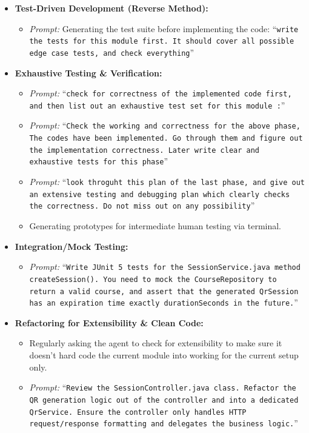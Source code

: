 \documentclass[11pt,a4paper]{article}
\begin{document}
\begin{itemize}[leftmargin=*, itemsep=6pt]
    \item \textbf{Test-Driven Development (Reverse Method):}
    \begin{itemize}[itemsep=4pt]
        \item \textit{Prompt:} Generating the test suite before implementing the code: ``\texttt{write the tests for this module first. It should cover all possible edge case tests, and check everything}''
    \end{itemize}

    \item \textbf{Exhaustive Testing \& Verification:}
    \begin{itemize}[itemsep=4pt]
        \item \textit{Prompt:} ``\texttt{check for correctness of the implemented code first, and then list out an exhaustive test set for this module :}''
        \item \textit{Prompt:} ``\texttt{Check the working and correctness for the above phase, The codes have been implemented. Go through them and figure out the implementation correctness. Later write clear and exhaustive tests for this phase}''
        \item \textit{Prompt:} ``\texttt{look throguht this plan of the last phase, and give out an extensive testing and debugging plan which clearly checks the correctness. Do not miss out on any possibility}''
        \item Generating prototypes for intermediate human testing via terminal.
    \end{itemize}

    \item \textbf{Integration/Mock Testing:}
    \begin{itemize}[itemsep=4pt]
        \item \textit{Prompt:} ``\texttt{Write JUnit 5 tests for the SessionService.java method createSession(). You need to mock the CourseRepository to return a valid course, and assert that the generated QrSession has an expiration time exactly durationSeconds in the future.}''
    \end{itemize}

    \item \textbf{Refactoring for Extensibility \& Clean Code:}
    \begin{itemize}[itemsep=4pt]
        \item Regularly asking the agent to check for extensibility to make sure it doesn't hard code the current module into working for the current setup only.
        \item \textit{Prompt:} ``\texttt{Review the SessionController.java class. Refactor the QR generation logic out of the controller and into a dedicated QrService. Ensure the controller only handles HTTP request/response formatting and delegates the business logic.}''
    \end{itemize}
\end{itemize}
\end{document}
